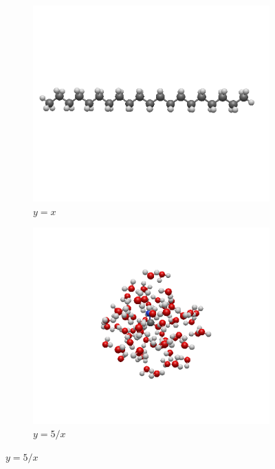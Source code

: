 \begin{figure}
     \centering
     \begin{subfigure}{0.4\textwidth}
         \centering
         \includegraphics[width=\textwidth]{Pics/alkan.png}
         \caption{$y=x$}
         \label{fig:y equals x}
     \end{subfigure}
	\begin{subfigure}{0.5\textwidth}
         \centering
         \includegraphics[width=\textwidth]{Pics/FW63.png}
         \caption{$y=5/x$}
         \label{fig:five over x}
     \end{subfigure}

\end{figure}
